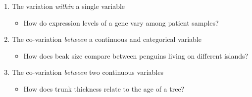 \documentclass[
  letterpaper,
  DIV=11,
  numbers=noendperiod]{scrreprt}
\providecommand{\tightlist}{%
  \setlength{\itemsep}{0pt}\setlength{\parskip}{0pt}}\usepackage{longtable,booktabs,array}
\begin{document}
\begin{enumerate}
\def\labelenumi{\arabic{enumi}.}
\tightlist
\item
  The variation \emph{within} a single variable

  \begin{itemize}
  \tightlist
  \item
    How do expression levels of a gene vary among patient samples?
  \end{itemize}
\item
  The co-variation \emph{between} a continuous and categorical variable

  \begin{itemize}
  \tightlist
  \item
    How does beak size compare between penguins living on different
    islands?
  \end{itemize}
\item
  The co-variation \emph{between} two continuous variables

  \begin{itemize}
  \tightlist
  \item
    How does trunk thickness relate to the age of a tree?
  \end{itemize}
\end{enumerate}
\end{document}
